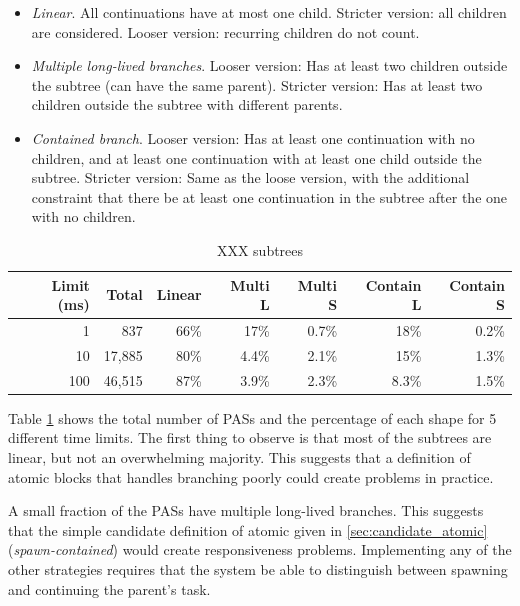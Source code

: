 \documentclass[acmsmall,anonymous,review]{acmart}\settopmatter{printfolios=true,printccs=false,printacmref=false}
\begin{document}
\begin{itemize}
\item \emph{Linear}. All continuations have at most one child.
  Stricter version: all children are considered.
  Looser version: recurring children do not count.
\item \emph{Multiple long-lived branches}. Looser version: Has at least two children outside the subtree (can have the same parent).
Stricter version: Has at least two children outside the subtree with different parents.
\item \emph{Contained branch}. Looser version: Has at least one continuation with no children, and at least one continuation with at least one child outside the subtree.
  Stricter version: Same as the loose version, with the additional constraint that there be at least one continuation in the subtree after the one with no children.
\end{itemize}

\begin{table}
  \centering
  \begin{tabular}{|r|r|r|r|r|r|r|}
    \hline
    Limit (ms) &  Total & Linear & Multi L & Multi S & Contain L & Contain S \\
    \hline
    1          &    837 &   66\% &    17\% &   0.7\% &      18\% &     0.2\% \\
    \hline
    10         & 17,885 &   80\% &   4.4\% &   2.1\% &      15\% &     1.3\% \\
    \hline
    100        & 46,515 &   87\% &   3.9\% &   2.3\% &     8.3\% &     1.5\% \\
    \hline
  \end{tabular}
  \caption{XXX subtrees}
  \label{table:subtrees}
\end{table}

Table \ref{table:subtrees} shows the total number of PASs and the percentage of each shape for 5 different time limits.
The first thing to observe is that most of the subtrees are linear, but not an overwhelming majority.
This suggests that a definition of atomic blocks that handles branching poorly could create problems in practice.

A small fraction of the PASs have multiple long-lived branches.
This suggests that the simple candidate definition of atomic given in \textsection\ref{sec:candidate_atomic} (\emph{spawn-contained}) would create responsiveness problems.
Implementing any of the other strategies requires that the system be able to distinguish between spawning and continuing the parent's task.
\end{document}
